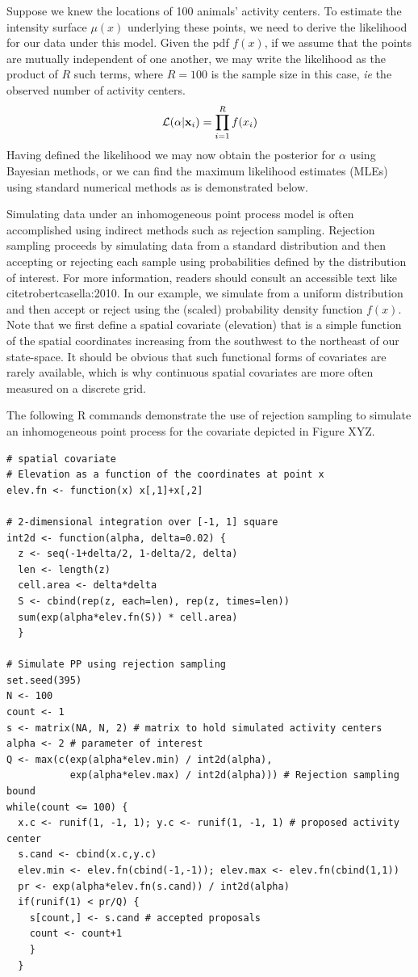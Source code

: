 Suppose we knew the locations of 100 animals' activity
centers. To estimate the intensity surface $\mu(x)$ underlying these points, we
need to derive the likelihood for our data under this model. Given the
pdf $f(x)$, if we assume that the points are
mutually independent of one another, we may write
the likelihood as the product
of $R$ such terms, where $R=100$ is the sample size in this case,
\emph{ie} the observed number of activity centers.
\[
\mathcal{L}({\bf \alpha} | {\bf x}_i) = \prod_{i=1}^R f(x_i)
\]
Having defined the likelihood we may now obtain the posterior for
$\alpha$ using Bayesian methods, or we can find the maximum likelihood
estimates (MLEs) using standard numerical methods as is demonstrated
below.

Simulating data under an inhomogeneous point process model is often
accomplished using indirect methods such as rejection
sampling. Rejection sampling proceeds by
simulating data from a standard distribution and then accepting or
rejecting each sample using probabilities defined by the distribution
of interest. For more information, readers should consult an
accessible text like citet{robertcasella:2010}. In our example, we
simulate from a uniform distribution and then accept or reject using
the (scaled) probability density function $f(x)$. Note that we first define a
spatial covariate (elevation) that is a simple function of the spatial
coordinates increasing from the southwest to the northeast of our
state-space. It should be obvious that such functional forms of
covariates are rarely available, which is why continuous spatial
covariates are more often measured on a discrete grid. 

The following R commands demonstrate the use of rejection sampling to
simulate an inhomogeneous point process for the covariate depicted in
Figure XYZ.



\begin{small}
\begin{verbatim}
# spatial covariate
# Elevation as a function of the coordinates at point x
elev.fn <- function(x) x[,1]+x[,2]

# 2-dimensional integration over [-1, 1] square
int2d <- function(alpha, delta=0.02) {
  z <- seq(-1+delta/2, 1-delta/2, delta)
  len <- length(z)
  cell.area <- delta*delta
  S <- cbind(rep(z, each=len), rep(z, times=len))
  sum(exp(alpha*elev.fn(S)) * cell.area)
  }

# Simulate PP using rejection sampling
set.seed(395)
N <- 100
count <- 1
s <- matrix(NA, N, 2) # matrix to hold simulated activity centers
alpha <- 2 # parameter of interest
Q <- max(c(exp(alpha*elev.min) / int2d(alpha),
           exp(alpha*elev.max) / int2d(alpha))) # Rejection sampling bound
while(count <= 100) {
  x.c <- runif(1, -1, 1); y.c <- runif(1, -1, 1) # proposed activity center
  s.cand <- cbind(x.c,y.c)
  elev.min <- elev.fn(cbind(-1,-1)); elev.max <- elev.fn(cbind(1,1))
  pr <- exp(alpha*elev.fn(s.cand)) / int2d(alpha)
  if(runif(1) < pr/Q) {
    s[count,] <- s.cand # accepted proposals
    count <- count+1
    }
  }
\end{verbatim}
\end{small}


